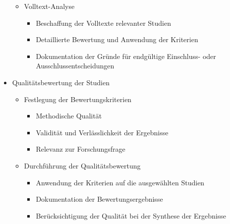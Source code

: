 \begin{itemize}
\begin{itemize}
\begin{itemize}
                \end{itemize}
            \item Volltext-Analyse
                \begin{itemize}
                    \item Beschaffung der Volltexte relevanter Studien
                    \item Detaillierte Bewertung und Anwendung der Kriterien
                    \item Dokumentation der Gründe für endgültige Einschluss- oder Ausschlussentscheidungen
                \end{itemize}
        \end{itemize}
    \item Qualitätsbewertung der Studien
        \begin{itemize}
            \item Festlegung der Bewertungskriterien
                \begin{itemize}
                    \item Methodische Qualität
                    \item Validität und Verlässlichkeit der Ergebnisse
                    \item Relevanz zur Forschungsfrage
                \end{itemize}
            \item Durchführung der Qualitätsbewertung
                \begin{itemize}
                    \item Anwendung der Kriterien auf die ausgewählten Studien
                    \item Dokumentation der Bewertungsergebnisse
                    \item Berücksichtigung der Qualität bei der Synthese der Ergebnisse
                \end{itemize}
        \end{itemize}
\end{itemize}

